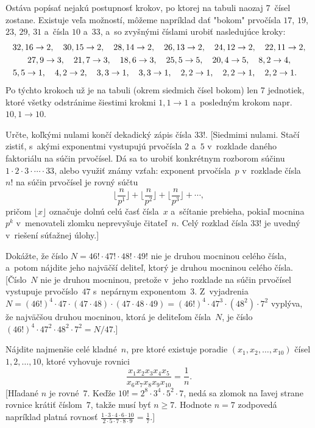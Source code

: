 {Ostáva popísať nejakú postupnosť krokov, po ktorej na tabuli naozaj 7~čísel zostane.
Existuje veľa možností, môžeme napríklad dať "bokom"
prvočísla $17$, $19$, $23$, $29$, $31$ a~čísla $10$ a~$33$,
a~so zvyšnými číslami urobiť nasledujúce kroky:
$$
\gathered
32, 16 \rightarrow 2,\quad
30, 15 \rightarrow 2,\quad
28, 14 \rightarrow 2,\quad
26, 13 \rightarrow 2,\quad
24, 12 \rightarrow 2,\quad
22, 11 \rightarrow 2,\\
27, 9 \rightarrow 3,\quad
21, 7 \rightarrow 3,\quad
18, 6 \rightarrow 3,\quad
25, 5 \rightarrow 5,\quad
20, 4 \rightarrow 5,\quad
8, 2 \rightarrow 4,\\
5, 5 \rightarrow 1,\quad
4, 2 \rightarrow 2,\quad
3, 3 \rightarrow 1,\quad
3, 3 \rightarrow 1,\quad
2, 2 \rightarrow 1,\quad
2, 2 \rightarrow 1,\quad
2, 2 \rightarrow 1.\quad
\endgathered
$$
Po týchto krokoch už je na tabuli (okrem siedmich čísel bokom)
len 7 jednotiek, ktoré všetky odstránime šiestimi krokmi
$1, 1 \rightarrow 1$ a~posledným krokom napr. $10, 1\rightarrow 10$.

Určte, koľkými nulami končí dekadický zápis čísla $33!$.
[Siedmimi nulami. Stačí zistiť, s~akými exponentmi vystupujú
prvočísla $2$ a~$5$ v~rozklade daného faktoriálu na súčin prvočísel. Dá sa
to urobiť konkrétnym rozborom súčinu $1\cdot2\cdot3\cdot\cdots\cdot33$,
alebo využiť známy vzťah:
exponent prvočísla~$p$ v~rozklade čísla~$n!$
na súčin prvočísel je rovný súčtu
$$
\biggl\lfloor\frac{n}{p^{1}}\biggr\rfloor+
\biggl\lfloor\frac{n}{p^{2}}\biggr\rfloor+
\biggl\lfloor\frac{n}{p^{3}}\biggr\rfloor+\cdots,
$$
pričom $\lfloor x\rfloor$ označuje dolnú celú časť čísla~$x$ a~sčítanie
prebieha, pokiaľ mocnina~$p^k$ v~menovateli zlomku neprevyšuje čitateľ~$n$.
Celý rozklad čísla $33!$ je uvedný v~riešení súťažnej úlohy.]

Dokážte, že číslo $N=46!\cdot47!\cdot48!\cdot49!$ nie je druhou
mocninou celého čísla, a~potom nájdite jeho najväčší deliteľ, ktorý
je druhou mocninou celého čísla. [Číslo~$N$ nie je druhou mocninou,
pretože v~jeho rozklade na súčin prvočísel vystupuje prvočíslo~$47$
s~nepárnym exponentom~$3$. Z~vyjadrenia
$N=(46!)^4\cdot47\cdot(47\cdot48)\cdot(47\cdot48\cdot49)=
(46!)^4\cdot47^3\cdot(48^2)\cdot7^2$ vyplýva, že najväčšou druhou
mocninou, ktorá je deliteľom čísla~$N$, je číslo
$(46!)^4\cdot47^2\cdot48^2\cdot7^2=N/47$.]

Nájdite najmenšie celé kladné~$n$, pre ktoré existuje poradie
$(x_1,x_2,\dots,x_{10})$ čísel $1,2,\dots,\allowbreak 10$, ktoré vyhovuje
rovnici
$$
\frac{x_1x_2x_3x_4x_5}{{x_6x_7x_8x_9x_{10}}}=\frac{1}{n}.
$$
[Hľadané $n$ je rovné~$7$. Keďže $10!=2^8\cdot3^4\cdot5^2\cdot7$,
nedá sa zlomok na ľavej strane rovnice krátiť číslom~$7$,
takže musí byť $n\ge7$. Hodnote $n=7$ zodpovedá napríklad platná
rovnosť
$\frac{1\cdot3\cdot4\cdot6\cdot10}{2\cdot5\cdot7\cdot8\cdot9}=\frac17$.]

}
